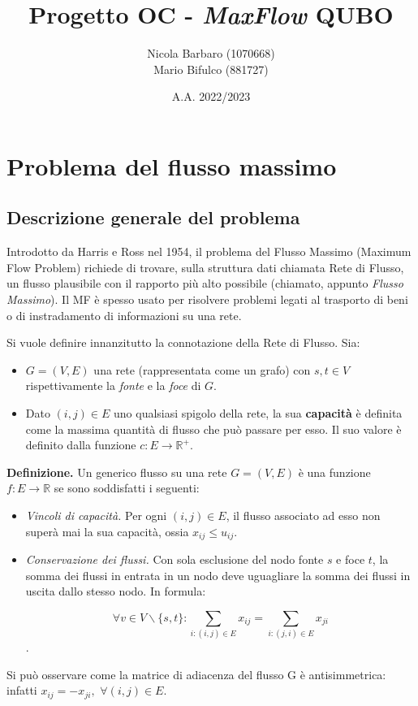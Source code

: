 \documentclass{article}
\author{Nicola Barbaro (1070668)\\Mario Bifulco (881727)}
\title{Progetto OC - \emph{MaxFlow} QUBO}
\date{A.A. 2022/2023}
\begin{document}
\maketitle
\tableofcontents
\pagebreak

\section{Problema del flusso massimo}

\subsection{Descrizione generale del problema}
Introdotto da Harris e Ross nel 1954, il problema del Flusso Massimo (Maximum Flow Problem) richiede di trovare, sulla struttura dati chiamata Rete di Flusso, un
flusso plausibile con il rapporto più alto possibile (chiamato, appunto \emph{Flusso Massimo}). Il MF è spesso usato per risolvere problemi legati al trasporto di beni o di 
instradamento di informazioni su una rete.

Si vuole definire innanzitutto la connotazione della Rete di Flusso. Sia:
\begin{itemize}
    \item $G = (V, E)$ una rete (rappresentata come un grafo) con $s, t \in V$ rispettivamente la \emph{fonte} e la \emph{foce} di $G$.
    \item Dato $(i, j) \in E$ uno qualsiasi spigolo della rete, la sua \textbf{capacità} è definita come la massima quantità di flusso che può passare per esso. 
    Il suo valore è definito dalla funzione $c : E \rightarrow \mathbb{R}^+$.
\end{itemize}

\textbf{Definizione.} Un generico flusso su una rete $G = (V, E)$ è una funzione $f : E \rightarrow \mathbb{R}$ se sono soddisfatti i seguenti:
\begin{itemize}
    \item \emph{Vincoli di capacità.} Per ogni $(i, j) \in E$, il flusso associato ad esso non superà mai la sua capacità, ossia $x_{ij} \leq u_{ij}$.
    \item \emph{Conservazione dei flussi.} Con sola esclusione del nodo fonte $s$ e foce $t$, la somma dei flussi in entrata in un nodo deve uguagliare la somma dei flussi in uscita
    dallo stesso nodo. In formula:

    \[ \forall v \in V \backslash \{s,t\}: \sum_{i: (i, j) \in E} x_{ij} = \sum_{i: (j,i) \in E} x_{ji}\] .
\end{itemize}
Si può osservare come la matrice di adiacenza del flusso G è antisimmetrica: infatti $x_{ij} = -x_{ji},$ $\forall (i, j) \in E$.\\
\end{document}
